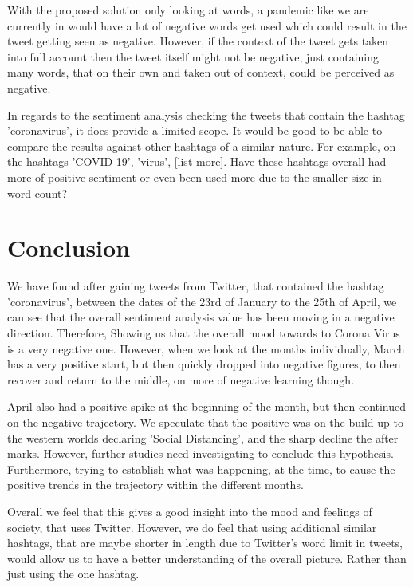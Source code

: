 \documentclass[a4paper,10pt]{article}
\begin{document}
With the proposed solution only looking at words, a pandemic like we are currently in would have a lot of negative words get used which could result in the tweet getting seen as negative. However, if the context of the tweet gets taken into full account then the tweet itself might not be negative, just containing many words, that on their own and taken out of context, could be perceived as negative.

In regards to the sentiment analysis checking the tweets that contain the hashtag 'coronavirus', it does provide a limited scope. It would be good to be able to compare the results against other hashtags of a similar nature. For example, on the hashtags 'COVID-19', 'virus', [list more]. Have these hashtags overall had more of positive sentiment or even been used more due to the smaller size in word count?

\section{Conclusion}
We have found after gaining tweets from Twitter, that contained the hashtag 'coronavirus', between the dates of the 23rd of January to the 25th of April, we can see that the overall sentiment analysis value has been moving in a negative direction. Therefore, Showing us that the overall mood towards to Corona Virus is a very negative one. However, when we look at the months individually, March has a very positive start, but then quickly dropped into negative figures, to then recover and return to the middle, on more of negative learning though.

April also had a positive spike at the beginning of the month, but then continued on the negative trajectory. We speculate that the positive was on the build-up to the western worlds declaring 'Social Distancing', and the sharp decline the after marks. However, further studies need investigating to conclude this hypothesis. Furthermore, trying to establish what was happening, at the time, to cause the positive trends in the trajectory within the different months.


Overall we feel that this gives a good insight into the mood and feelings of society, that uses Twitter. However, we do feel that using additional similar hashtags, that are maybe shorter in length due to Twitter's word limit in tweets, would allow us to have a better understanding of the overall picture. Rather than just using the one hashtag. 


\newpage
%	
\end{document}

